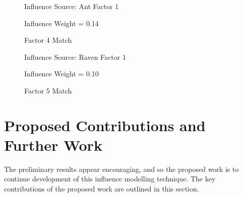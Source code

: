 \documentclass{article}
\begin{document}
\begin{figure}%
    \centering
    \qquad
    \caption{Factor 4 Match}%
    \label{fig:com4}%
    Influence Source: Ant Factor 1 
    \par Influence Weight = 0.14
\end{figure}

\begin{figure}%
    \centering
    \qquad
    \caption{Factor 5 Match}%
    \label{fig:com5}%
    Influence Source: Raven Factor 1 
    \par Influence Weight = 0.10
\end{figure}

\section{Proposed Contributions and Further Work}
The preliminary results appear encouraging, and so the proposed work
is to continue development of this influence modelling technique.  The
key contributions of the proposed work are outlined in this section.
\end{document}
